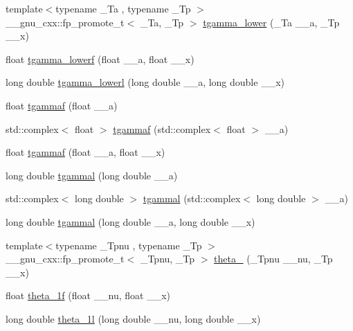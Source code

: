 \begin{DoxyCompactItemize}
\item 
{\footnotesize template$<$typename \+\_\+\+Ta , typename \+\_\+\+Tp $>$ }\\\+\_\+\+\_\+gnu\+\_\+cxx\+::fp\+\_\+promote\+\_\+t$<$ \+\_\+\+Ta, \+\_\+\+Tp $>$ \hyperlink{group__gnu__math__spec__func_gaed107908dec8865ea48e7764f7ea88a2}{tgamma\+\_\+lower} (\+\_\+\+Ta \+\_\+\+\_\+a, \+\_\+\+Tp \+\_\+\+\_\+x)
\item 
float \hyperlink{group__gnu__math__spec__func_ga8f2aabeaa29d21b19c43972efb26798c}{tgamma\+\_\+lowerf} (float \+\_\+\+\_\+a, float \+\_\+\+\_\+x)
\item 
long double \hyperlink{group__gnu__math__spec__func_gad057fe49a5bf95b1550f5f0a6e60bb19}{tgamma\+\_\+lowerl} (long double \+\_\+\+\_\+a, long double \+\_\+\+\_\+x)
\item 
float \hyperlink{group__gnu__math__spec__func_ga008b1f4cc3a54c9c8221ad1f3504b593}{tgammaf} (float \+\_\+\+\_\+a)
\item 
std\+::complex$<$ float $>$ \hyperlink{group__gnu__math__spec__func_gaf548b80db1501cbc067de1564e721972}{tgammaf} (std\+::complex$<$ float $>$ \+\_\+\+\_\+a)
\item 
float \hyperlink{group__gnu__math__spec__func_ga942773871e9c21a50cf13ec160e7e8d9}{tgammaf} (float \+\_\+\+\_\+a, float \+\_\+\+\_\+x)
\item 
long double \hyperlink{group__gnu__math__spec__func_ga2c7d954852d84665aabd43566d67e344}{tgammal} (long double \+\_\+\+\_\+a)
\item 
std\+::complex$<$ long double $>$ \hyperlink{group__gnu__math__spec__func_ga8d53515dba9c860fd6058a4b75aaff58}{tgammal} (std\+::complex$<$ long double $>$ \+\_\+\+\_\+a)
\item 
long double \hyperlink{group__gnu__math__spec__func_gabebff9ffba6acf55f3a3cd716ef5007a}{tgammal} (long double \+\_\+\+\_\+a, long double \+\_\+\+\_\+x)
\item 
{\footnotesize template$<$typename \+\_\+\+Tpnu , typename \+\_\+\+Tp $>$ }\\\+\_\+\+\_\+gnu\+\_\+cxx\+::fp\+\_\+promote\+\_\+t$<$ \+\_\+\+Tpnu, \+\_\+\+Tp $>$ \hyperlink{group__gnu__math__spec__func_gaa2e5a3a5f550fe032a596a8b01c878c0}{theta\+\_} (\+\_\+\+Tpnu \+\_\+\+\_\+nu, \+\_\+\+Tp \+\_\+\+\_\+x)
\item 
float \hyperlink{group__gnu__math__spec__func_ga5bbf256b875da28132f9049f5984cb14}{theta\+\_\+1f} (float \+\_\+\+\_\+nu, float \+\_\+\+\_\+x)
\item 
long double \hyperlink{group__gnu__math__spec__func_ga3520684c78771ffa57180060c8b6d1ca}{theta\+\_\+1l} (long double \+\_\+\+\_\+nu, long double \+\_\+\+\_\+x)

\end{DoxyCompactItemize}
